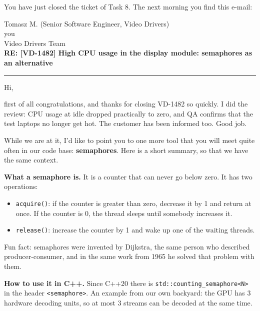 \newcommand{\mailfield}[2]{\textcolor{nLine}{\makebox[1.6cm][l]{#1}}#2\\}

You have just closed the ticket of Task 8. The next morning you find this e-mail:

\begin{email}
{\small
\mailfield{From:}{Tomasz M. (Senior Software Engineer, Video Drivers)}
\mailfield{To:}{you}
\mailfield{Cc:}{Video Drivers Team}
\mailfield{Subject:}{\textbf{RE: [VD-1482] High CPU usage in the display module: semaphores as an alternative}}}
\vspace{-0.3em}\textcolor{nLight}{\rule{\linewidth}{0.6pt}}

Hi,

first of all congratulations, and thanks for closing VD-1482 so quickly. I did the review: CPU usage at idle dropped
practically to zero, and QA confirms that the test laptops no longer get hot. The customer has been informed
too. Good job.

While we are at it, I'd like to point you to one more tool that you will meet quite often in our code base:
\textbf{semaphores}. Here is a short summary, so that we have the same context.

\textbf{What a semaphore is.} It is a counter that can never go below zero. It has two operations:
\begin{itemize}
  \item \texttt{acquire()}: if the counter is greater than zero, decrease it by 1 and return at once.
        If the counter is 0, the thread sleeps until somebody increases it.
  \item \texttt{release()}: increase the counter by 1 and wake up one of the waiting threads.
\end{itemize}

Fun fact: semaphores were invented by Dijkstra, the same person who described producer-consumer, and in the same
work from 1965 he solved that problem with them.

\textbf{How to use it in C++.} Since C++20 there is \texttt{std::counting\_semaphore<N>} in the header
\texttt{<semaphore>}. An example from our own backyard: the GPU has 3 hardware decoding units, so at most 3 streams
can be decoded at the same time.


\end{email}
